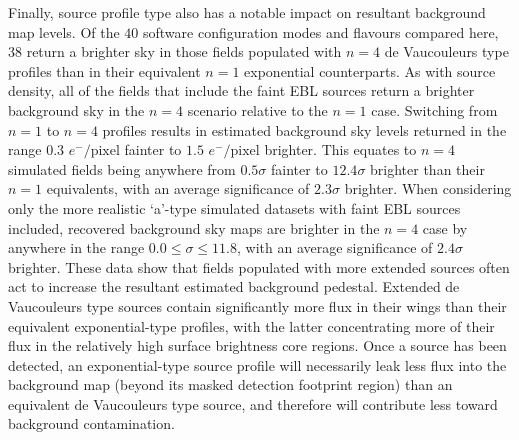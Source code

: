 \documentclass[fleqn,usenatbib,useAMS]{mnras}
\begin{document}
Finally, source profile type also has a notable impact on resultant background map levels. Of the $40$ software configuration modes and flavours compared here, $38$ return a brighter sky in those fields populated with $n=4$ de Vaucouleurs type profiles than in their equivalent $n=1$ exponential counterparts. As with source density, all of the fields that include the faint EBL sources return a brighter background sky in the $n=4$ scenario relative to the $n=1$ case. Switching from $n=1$ to $n=4$ profiles results in estimated background sky levels returned in the range $0.3$ $e^{-}/\textrm{pixel}$ fainter to $1.5$ $e^{-}/\textrm{pixel}$ brighter. This equates to $n=4$ simulated fields being anywhere from $0.5\sigma$ fainter to $12.4\sigma$ brighter than their $n=1$ equivalents, with an average significance of $2.3\sigma$ brighter. When considering only the more realistic `a'-type simulated datasets with faint EBL sources included, recovered background sky maps are brighter in the $n=4$ case by anywhere in the range $0.0\le\sigma\le11.8$, with an average significance of $2.4\sigma$ brighter. These data show that fields populated with more extended sources often act to increase the resultant estimated background pedestal. Extended de Vaucouleurs type sources contain significantly more flux in their wings than their equivalent exponential-type profiles, with the latter concentrating more of their flux in the relatively high surface brightness core regions. Once a source has been detected, an exponential-type source profile will necessarily leak less flux into the background map (beyond its masked detection footprint region) than an equivalent de Vaucouleurs type source, and therefore will contribute less toward background contamination.
\end{document}
